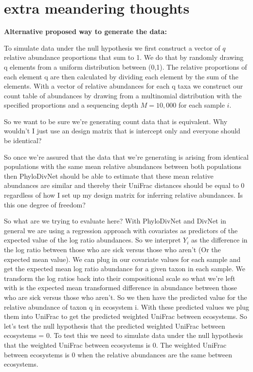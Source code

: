 \documentclass{article}
\begin{document}
\section{extra meandering thoughts}

\textbf{Alternative proposed way to generate the data:}

To simulate data under the null hypothesis we first construct a vector of $q$ relative abundance proportions that sum to 1. We do that by randomly drawing q elements from a uniform distribution between (0,1). The relative proportions of each element q are then calculated by dividing each element by the sum of the elements. With a vector of relative abundances for each q taxa we construct our count table of abundances by drawing from a multinomial distribution with the specified proportions and a sequencing depth $M = 10,000$ for each sample $i$.

So we want to be sure we're generating count data that is equivalent. Why wouldn't I just use an design matrix that is intercept only and everyone should be identical?

So once we're assured that the data that we're generating is arising from identical populations with the same mean relative abundances between both populations then PhyloDivNet should be able to estimate that these mean relative abundances are similar and thereby their UniFrac distances should be equal to 0 regardless of how I set up my design matrix for inferring relative abundances. Is this one degree of freedom?

So what are we trying to evaluate here? With PhyloDivNet and DivNet in general we are using a regression approach with covariates as predictors of the expected value of the log ratio abundances. So we interpret $Y_i$ as the difference in the log ratio between those who are sick versus those who aren't (Or the expected mean value). We can plug in our covariate values for each sample and get the expected mean log ratio abundance for a given taxon in each sample. We transform the log ratios back into their compositional scale so what we're left with is the expected mean transformed difference in abundance between those who are sick versus those who aren't. So we then have the predicted value for the relative abundance of taxon q in ecosystem i. With these predicted values we plug them into UniFrac to get the predicted weighted UniFrac between ecosystems. So let's test the null hypothesis that the predicted weighted UniFrac between ecosystems = 0. To test this we need to simulate data under the null hypothesis that the weighted UniFrac between ecosystems is 0. The weighted UniFrac between ecosystems is 0 when the relative abundances are the same between ecosystems.
\end{document}
